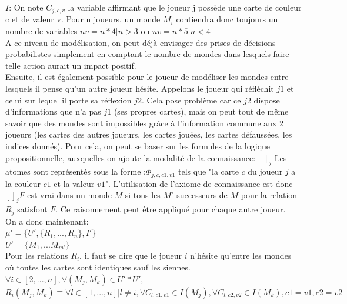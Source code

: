 \documentclass[11pt, letterpaper]{article}
\begin{document}
\noindent
$I$: On note    $C_{j,c,v}$ la variable affirmant que le joueur j possède une carte de couleur c et de valeur v. Pour n joueurs, un monde $M_{i}$ contiendra donc toujours un nombre de variables $nv=n*4 | n>3$ ou $nv=n*5 | n<4$\\

\noindent
A ce niveau de modélisation, on peut déjà envisager des prises de décisions probabilistes simplement en comptant le nombre de mondes dans lesquels faire telle action aurait un impact positif.\\

\noindent
Ensuite, il est également possible pour le joueur de modéliser les mondes entre lesquels il pense qu'un autre joueur hésite. Appelons le joueur qui réfléchit $j1$ et celui sur lequel il porte sa réflexion $j2$. Cela pose problème car ce $j2$ dispose d'informations que n'a pas $j1$ (ses propres cartes), mais on peut tout de même savoir que des mondes sont impossibles grâce à l'information commune aux 2 joueurs (les cartes des autres joueurs, les cartes jouées, les cartes défaussées, les indices donnés).
Pour cela, on peut se baser sur les formules de la logique propositionnelle, auxquelles on ajoute la modalité de la connaissance: $[]_j$ Les atomes sont représentés sous la forme :$\Phi_{j,c,c1,v1}$ tels que "la carte $c$ du joueur $j$ a la couleur $c1$ et la valeur $v1$". L'utilisation de l'axiome de connaissance est donc   $[]_j F$ est vrai dans un monde $M$ si tous les $M'$ successeurs de $M$ pour la relation $R_j$ satisfont $F$. Ce raisonnement peut être appliqué pour chaque autre joueur.\\

\noindent
On a donc maintenant:\\

$\mu'=\{U',\{R_{1},...,R_{n}\},I' \} $\\

$U'=\{M_{1},...M_{m'} \} $\\

\noindent
Pour les relations $R_{i}$, il faut se dire que le joueur $i$ n'hésite qu'entre les mondes où toutes les cartes sont identiques sauf les siennes.\\

$   \forall i \in [2,...,n] ,  \forall (M_{j},M_{k}) \in U'*U',$\\

$R_{i}(M_{j},M_{k}) 
\equiv
\forall l \in [1,...,n]|l \ne i,  \forall C_{l,c1,v1} \in  I(M_{j}), \forall C_{l,c2,v2} \in  I(M_{k}), c1=v1, c2=v2    $\\
\end{document}

